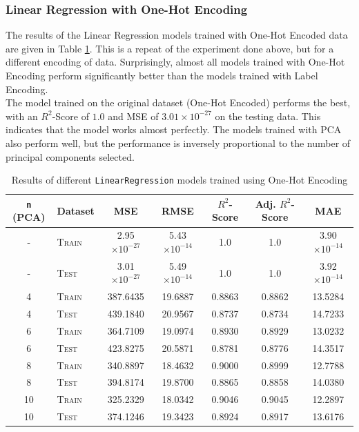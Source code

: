 \documentclass[12pt]{article}
\begin{document}
    \subsubsection*{Linear Regression with One-Hot Encoding}
    The results of the Linear Regression models trained with One-Hot Encoded data are given in Table \ref{tab:linear_onehot}. This is a
    repeat of the experiment done above, but for a different encoding of data. Surprisingly, almost all models trained with One-Hot Encoding
    perform significantly better than the models trained with Label Encoding.
    \vspace*{5pt} \\
    The model trained on the original dataset (One-Hot Encoded) performs the best, with an $R^{2}$-Score of $1.0$ and MSE of $3.01 \times 10^{-27}$
    on the testing data. This indicates that the model works almost perfectly. The models trained with PCA also perform well, but the performance
    is inversely proportional to the number of principal components selected.
    \begin{table}[htbp]
        \centering
        \begin{tabular}{|c|l|c|c|c|c|c|}
            \hline
            \texttt{n} (PCA) & Dataset & MSE & RMSE & $R^{2}$-Score & Adj. $R^{2}$-Score & MAE \\
            \hline \hline
            - & \textsc{Train} & 2.95 $\times 10^{-27}$ & 5.43 $\times 10^{-14} $ & 1.0 & 1.0 & 3.90 $\times 10^{-14}$ \\
            \hline
            - & \textsc{Test} & 3.01 $\times 10^{-27}$ & 5.49 $\times 10^{-14}$ & 1.0 & 1.0 & 3.92 $\times 10^{-14}$ \\
            \hline
            4 & \textsc{Train} & 387.6435 & 19.6887 & 0.8863 & 0.8862 & 13.5284 \\
            \hline
            4 & \textsc{Test} & 439.1840 & 20.9567 & 0.8737 & 0.8734 & 14.7233 \\
            \hline
            6 & \textsc{Train} & 364.7109 & 19.0974 & 0.8930 & 0.8929 & 13.0232 \\
            \hline
            6 & \textsc{Test} & 423.8275 & 20.5871 & 0.8781 & 0.8776 & 14.3517 \\
            \hline
            8 & \textsc{Train} & 340.8897 & 18.4632 & 0.9000 & 0.8999 & 12.7788 \\
            \hline
            8 & \textsc{Test} & 394.8174 & 19.8700 & 0.8865 & 0.8858 & 14.0380 \\
            \hline
            10 & \textsc{Train} & 325.2329 & 18.0342 & 0.9046 & 0.9045 & 12.2897 \\
            \hline
            10 & \textsc{Test} & 374.1246 & 19.3423 & 0.8924 & 0.8917 & 13.6176 \\
            \hline
        \end{tabular}
        \caption{Results of different \texttt{LinearRegression} models trained using One-Hot Encoding}
        \label{tab:linear_onehot}
    \end{table}
\end{document}

